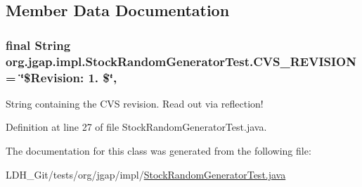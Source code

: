 \subsection{Member Data Documentation}
\hypertarget{classorg_1_1jgap_1_1impl_1_1_stock_random_generator_test_ac2d1d4030ee1124f3bb1bc7a8a59bd00}{
\subsubsection[{C\-V\-S\-\_\-\-R\-E\-V\-I\-S\-I\-O\-N}]{\setlength{\rightskip}{0pt plus 5cm}final String org.\-jgap.\-impl.\-Stock\-Random\-Generator\-Test.\-C\-V\-S\-\_\-\-R\-E\-V\-I\-S\-I\-O\-N = \char`\"{}\$Revision\-: 1. \$\char`\"{}\hspace{0.3cm}{\ttfamily [static]}, {\ttfamily [private]}}}\label{classorg_1_1jgap_1_1impl_1_1_stock_random_generator_test_ac2d1d4030ee1124f3bb1bc7a8a59bd00}
String containing the C\-V\-S revision. Read out via reflection! 

Definition at line 27 of file Stock\-Random\-Generator\-Test.\-java.



The documentation for this class was generated from the following file\-:\begin{DoxyCompactItemize}
\item 
L\-D\-H\-\_\-\-Git/tests/org/jgap/impl/\hyperlink{_stock_random_generator_test_8java}{Stock\-Random\-Generator\-Test.\-java}\end{DoxyCompactItemize}
